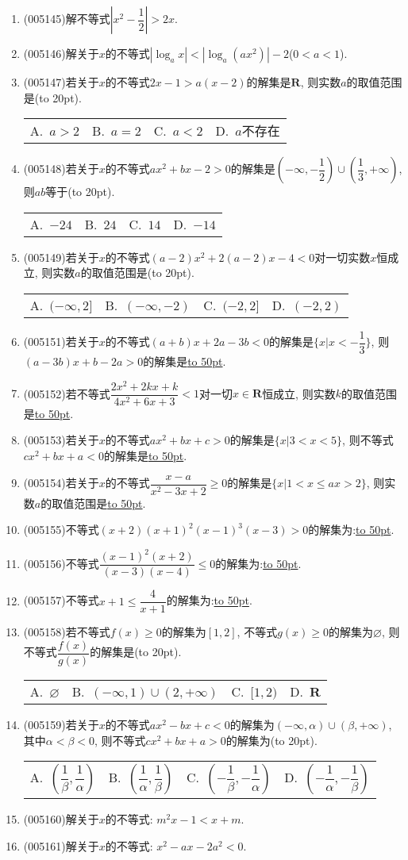 \documentclass[10pt,a4paper]{article}
\newcommand{\blank}[1]{\underline{\hbox to #1pt{}}}
\newcommand{\bracket}[1]{(\hbox to #1pt{})}
\newcommand{\fourch}[4]{\par\begin{tabular}{p{.23\textwidth}p{.23\textwidth}p{.23\textwidth}p{.23\textwidth}}
A.~#1 &B.~#2& C.~#3& D.~#4
\end{tabular}}
\begin{document}
\begin{enumerate}[1.]
\item {\tiny (005145)}解不等式$|x^2-\dfrac 12|>2x$.
\item {\tiny (005146)}解关于$x$的不等式$|\log_ax|<|\log_a(ax^2)|-2$($0<a<1$).
\item {\tiny (005147)}若关于$x$的不等式$2x-1>a(x-2)$的解集是$\mathbf{R}$, 则实数$a$的取值范围是\bracket{20}.
\fourch{$a>2$}{$a=2$}{$a<2$}{$a$不存在}
\item {\tiny (005148)}若关于$x$的不等式$ax^2+bx-2>0$的解集是$(-\infty ,-\dfrac 12)\cup (\dfrac 13,+\infty)$, 则$ab$等于\bracket{20}.
\fourch{$-24$}{$24$}{$14$}{$-14$}
\item {\tiny (005149)}若关于$x$的不等式$(a-2)x^2+2(a-2)x-4<0$对一切实数$x$恒成立, 则实数$a$的取值范围是\bracket{20}.
\fourch{$(-\infty ,2]$}{$(-\infty,-2)$}{$(-2,2]$}{$(-2,2)$}
\item {\tiny (005151)}若关于$x$的不等式$(a+b)x+2a-3b<0$的解集是$\{x|x<-\dfrac 13\}$, 则$(a-3b)x+b-2a>0$的解集是\blank{50}.
\item {\tiny (005152)}若不等式$\dfrac{2x^2+2kx+k}{4x^2+6x+3}<1$对一切$x\in \mathbf{R}$恒成立, 则实数$k$的取值范围是\blank{50}.
\item {\tiny (005153)}若关于$x$的不等式$ax^2+bx+c>0$的解集是$\{x|3<x<5\}$, 则不等式$cx^2+bx+a<0$的解集是\blank{50}.
\item {\tiny (005154)}若关于$x$的不等式$\dfrac{x-a}{x^2-3x+2}\ge 0$的解集是$\{x|1<x\le ax>2\}$, 则实数$a$的取值范围是\blank{50}.
\item {\tiny (005155)}不等式$(x+2)(x+1)^2(x-1)^3(x-3)>0$的解集为:\blank{50}.
\item {\tiny (005156)}不等式$\dfrac{(x-1)^2(x+2)}{(x-3)(x-4)}\le 0$的解集为:\blank{50}.
\item {\tiny (005157)}不等式$x+1\le \dfrac 4{x+1}$的解集为:\blank{50}.
\item {\tiny (005158)}若不等式$f(x)\ge 0$的解集为$[1,2]$, 不等式$g(x)\ge 0$的解集为$\varnothing$, 则不等式$\dfrac{f(x)}{g(x)}$的解集是\bracket{20}.
\fourch{$\varnothing$}{$(-\infty ,1)\cup (2,+\infty)$}{$[1,2)$}{$\mathbf{R}$}
\item {\tiny (005159)}若关于$x$的不等式$ax^2-bx+c<0$的解集为$(-\infty ,\alpha)\cup (\beta ,+\infty)$, 其中$\alpha <\beta <0$, 则不等式$cx^2+bx+a>0$的解集为\bracket{20}.
\fourch{$(\dfrac 1{\beta},\dfrac 1{\alpha})$}{$(\dfrac 1{\alpha},\dfrac 1{\beta})$}{$(-\dfrac 1{\beta},-\dfrac 1{\alpha})$}{$(-\dfrac 1{\alpha},-\dfrac 1{\beta})$}
\item {\tiny (005160)}解关于$x$的不等式: $m^2x-1<x+m$.
\item {\tiny (005161)}解关于$x$的不等式: $x^2-ax-2a^2<0$.

\end{enumerate}
\end{document}
